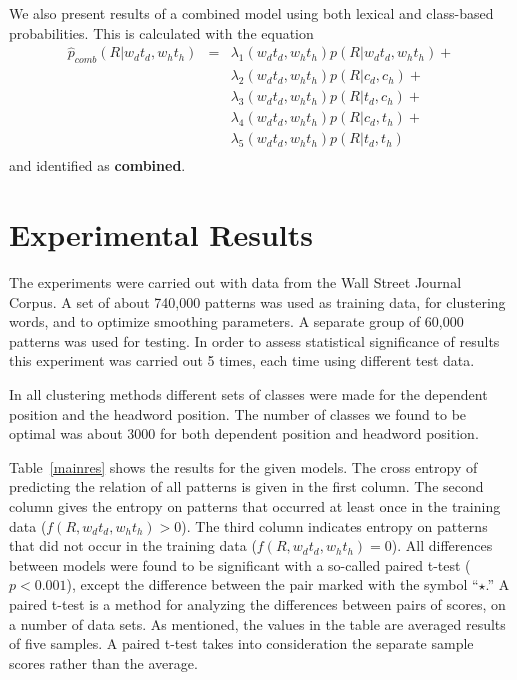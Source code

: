 We also present results of a combined model using both lexical
and class-based probabilities. This is calculated with the equation
\begin{eqnarray*}
\hat{p}_{comb}(R|w_{d}t_{d}, w_{h}t_{h}) 
 & = & \lambda_{1}(w_{d}t_{d}, w_{h}t_{h})p(R|w_{d}t_{d}, w_{h}t_{h}) + \\
      &  & \lambda_{2}(w_{d}t_{d}, w_{h}t_{h})p(R|c_{d}, c_{h}) + \\
      &  & \lambda_{3}(w_{d}t_{d}, w_{h}t_{h})p(R|t_{d}, c_{h}) + \\
      &  & \lambda_{4}(w_{d}t_{d}, w_{h}t_{h})p(R|c_{d}, t_{h}) + \\
      &  & \lambda_{5}(w_{d}t_{d}, w_{h}t_{h})p(R|t_{d}, t_{h}) \\
\end{eqnarray*}
and identified as {\bf combined}.

\section{Experimental Results}

The experiments were carried out with data from the Wall Street
Journal Corpus. A set of about 740,000 patterns was used as training
data, for clustering words, and to optimize smoothing parameters. A
separate group of 60,000 patterns was used for testing.  In order to
assess statistical significance of results this experiment was carried
out 5 times, each time using different test data.

In all clustering methods different sets of classes were made for the
dependent position and the headword position. The number of classes we
found to be optimal was about 3000 for both dependent position and
headword position.

Table~\ref{mainres} shows the results for the given models. The
cross entropy of predicting the relation of all patterns is given in the
first column. The second column gives the entropy on patterns that
occurred at least once in the training data
($f(R,w_{d}t_{d},w_{h}t_{h})>0$). The third column indicates entropy on
patterns that did not occur in the training data
($f(R,w_{d}t_{d},w_{h}t_{h}) = 0$). 
All differences between models were found to be
significant with a so-called paired t-test ($p<0.001$), except the
difference between the pair marked with the symbol ``$\star$.''  A
paired t-test is a method for analyzing the differences between pairs
of scores, on a number of data sets. As mentioned, the values in the
table are averaged results of five samples. A paired t-test takes into
consideration the separate sample scores rather than the average.

